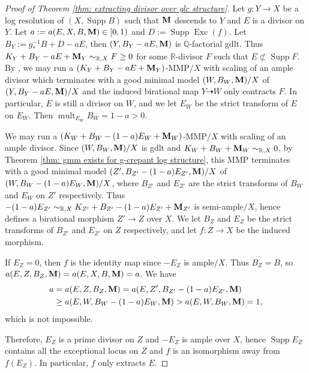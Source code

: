 \documentclass[11pt]{amsart}
\numberwithin{equation}{section}
\newcommand{\Mm}{{\bf{M}}}
\newcommand{\Exc}{\operatorname{Exc}}
\newcommand{\Supp}{\operatorname{Supp}}
\newcommand{\mult}{\operatorname{mult}}
\theoremstyle{definition}
\theoremstyle{definition}
\theoremstyle{definition}
\begin{document}
    \begin{proof}[Proof of Theorem \ref{thm: extracting divisor over
      glc structure}]
      Let $g: Y\rightarrow X$ be a log resolution of $(X,\Supp B)$
      such that $\Mm$ descends to $Y$ and $E$ is a divisor on $Y$.
      Let $a:=a(E,X,B,\Mm)\in[0,1)$ and $D:=\Supp\Exc(f)$. Let
      $B_Y:=g^{-1}_*B+D-aE$, then $(Y,B_Y-aE,\Mm)$ is $\mathbb
      Q$-factorial gdlt. Thus $K_Y+B_Y-aE+\Mm_Y\sim_{\mathbb
      R,X}F\geq 0$ for some $\mathbb R$-divisor $F$ such that
      $E\not\subset\Supp F$. By \cite[Lemma 2.3]{LX22}, we may run a
      $(K_Y+B_Y-aE+\Mm_Y)$-MMP$/X$ with scaling of an ample divisor
      which terminates with a good minimal model $(W,B_W,\Mm)/X$ of
      $(Y,B_Y-aE,\Mm)/X$ and the induced birational map
      $Y\dashrightarrow W$ only contracts $F$. In particular, $E$ is
      still a divisor on $W$, and we let $E_W$ be the strict
      transform of $E$ on $E_W$. Then $\mult_{E_W}B_W=1-a>0$.

      We may run a $(K_W+B_W-(1-a)E_W+\Mm_W)$-MMP$/X$ with scaling of
      an ample divisor. Since $(W,B_W,\Mm)/X$ is gdlt and
      $K_W+B_W+\Mm_W\sim_{\mathbb R,X}0$, by Theorem \ref{thm: gmm
      exists for g-crepant log structure}, this MMP terminates with a
      good minimal model $(Z',B_{Z'}-(1-a)E_{Z'},\Mm)/X$ of
      $(W,B_W-(1-a)E_W,\Mm)/X$, where $B_{Z'}$ and $E_{Z'}$ are the
      strict transforms of $B_W$ and $E_W$ on $Z'$ respectively. Thus
      $-(1-a)E_{Z'}\sim_{\mathbb
      R,X}K_{Z'}+B_{Z'}-(1-a)E_{Z'}+\Mm_{Z'}$ is semi-ample$/X$,
      hence defines a birational morphism $Z'\rightarrow Z$ over $X$.
      We let $B_Z$ and $E_Z$ be the strict transforms of $B_{Z'}$ and
      $E_{Z'}$ on $Z$ respectively, and let $f: Z\rightarrow X$ be
      the induced morphism.

      If $E_Z=0$, then $f$ is the identity map since $-E_Z$ is
      ample$/X$. Thus $B_Z=B$, so $a(E,Z,B_Z,\Mm)=a(E,X,B,\Mm)=a$. We have
      \begin{align*}
        a&=a(E,Z,B_Z,\Mm)=a(E,Z',B_{Z'}-(1-a)E_{Z'},\Mm)\\
        &\geq a(E,W,B_W-(1-a)E_W,\Mm)>a(E,W,B_W,\Mm)=1,
      \end{align*}
      which is not impossible.

      Therefore, $E_Z$ is a prime divisor on $Z$ and $-E_Z$ is ample
      over $X$, hence $\Supp E_Z$ contains all the exceptional locus
      on $Z$ and $f$ is an isomorphism away from $f(E_Z)$. In
      particular, $f$ only extracts $E$.
    \end{proof}
\end{document}
